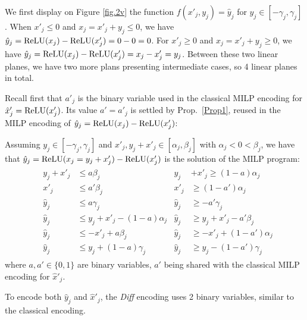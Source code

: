 We first display on Figure \ref{fig.2v} the function $f(x'_j,y_j)=\hat{y}_j$ for $y_j \in [- \gamma_j, \gamma_j]$. 
	When $x'_j \leq 0$ and $x_j = x'_j+y_j \leq 0$, we have $\hat{y}_j = \mathrm{ReLU}(x_j) - \mathrm{ReLU}(x'_j) = 0-0=0$. For $x'_j \geq 0$ and $x_j = x'_j+y_j \geq 0$, we have $\hat{y}_j= \mathrm{ReLU}(x_j)-\mathrm{ReLU}(x'_j)=x_j - x'_j = y_j$. 
    Between these two linear planes, we have two more plans presenting intermediate cases, so 4 linear planes in total.
	

Recall first that $a'_j$ is the binary variable used in the 
classical MILP encoding for $\hat{x}'_j=\mathrm{ReLU}(x'_j)$.
Its value $a'=a'_j$ is settled by Prop.~\ref{Prop1},
reused in the MILP encoding of $\hat{y}_j = \mathrm{ReLU}(x_j)-\mathrm{ReLU}(x'_j)$:


\begin{proposition}
    \label{Prop2}
Assuming $y_j \in [-\gamma_j, \gamma_j]$ and $x'_j,y_j+x'_j \in [\alpha_j,\beta_j]$ with  $\alpha_j<0<\beta_j$, we have that $\hat{y}_j = \mathrm{ReLU}(x_j=y_j + x'_j) - \mathrm{ReLU}(x'_j)$ is the solution of the MILP program:
	\begin{align*}
		& \begin{aligned}
			y_j + x'_j &\leq a\beta_j        &
			y_j &+ x'_j \geq (1-a)\alpha_j \\
			x'_j       &\leq a'\beta_j       & 
			x'_j       &\geq (1-a')\alpha_j \\
			\hat{y}_j  &\leq a\gamma_j       &
			\hat{y}_j  &\geq -a'\gamma_j \\
			\hat{y}_j  &\leq y_j + x'_j - (1-a)\alpha_j &
			\hat{y}_j  &\geq y_j + x'_j - a'\beta_j \\
			\hat{y}_j  &\leq -x'_j + a\beta_j &
			\hat{y}_j  &\geq -x'_j + (1-a')\alpha_j \\
			\hat{y}_j  &\leq y_j + (1-a)\gamma_j  &
			\hat{y}_j  &\geq y_j - (1-a')\gamma_j
		\end{aligned}
	\end{align*} 
    where $a,a' \in \{0,1\}$ are binary variables, 
    $a'$ being shared with the classical MILP
    encoding for $\hat{x}'_j$.
\end{proposition}

To encode both $\hat{y}_j$ and $\hat{x}'_j$, the {\em Diff} encoding uses 2 binary variables, similar to the classical encoding.

